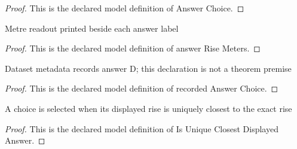 \begin{proof}
  This is the declared model definition of Answer Choice.
\end{proof}
\begin{definition}
  \label{def:physics:phyx-mini-0154:phyxminiproblems-problemphyxmini0154-answerrisemeters}
  Metre readout printed beside each answer label
\end{definition}
\begin{proof}
  This is the declared model definition of answer Rise Meters.
\end{proof}
\begin{definition}
  \label{def:physics:phyx-mini-0154:phyxminiproblems-problemphyxmini0154-recordedanswerchoice}
  Dataset metadata records answer D; this declaration is not a theorem premise
\end{definition}
\begin{proof}
  This is the declared model definition of recorded Answer Choice.
\end{proof}
\begin{definition}
  \label{def:physics:phyx-mini-0154:phyxminiproblems-problemphyxmini0154-isuniqueclosestdisplayedanswer}
  A choice is selected when its displayed rise is uniquely closest to the exact rise
\end{definition}
\begin{proof}
  This is the declared model definition of Is Unique Closest Displayed Answer.
\end{proof}
